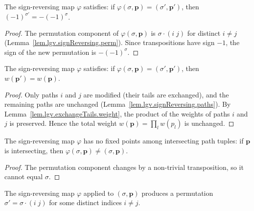 \begin{lemma}
\label{lem.lgv.signReversing.sign}
\leanhelper
\leanok
The sign-reversing map $\varphi$ satisfies: if
$\varphi(\sigma,\mathbf{p}) = (\sigma', \mathbf{p}')$, then
$(-1)^{\sigma'} = -(-1)^{\sigma}$.
\end{lemma}

\begin{proof}
\leanok
The permutation component of $\varphi(\sigma, \mathbf{p})$ is
$\sigma \cdot (i\; j)$ for distinct $i \ne j$
(Lemma~\ref{lem.lgv.signReversing.perm}).  Since transpositions
have sign $-1$, the sign of the new permutation is $-(-1)^\sigma$.
\end{proof}

\begin{lemma}
\label{lem.lgv.signReversing.weight}
\leanhelper
\leanok
The sign-reversing map $\varphi$ satisfies: if
$\varphi(\sigma, \mathbf{p}) = (\sigma', \mathbf{p}')$, then
$w(\mathbf{p}') = w(\mathbf{p})$.
\end{lemma}

\begin{proof}
\leanok
Only paths $i$ and $j$ are modified (their tails are exchanged), and
the remaining paths are unchanged
(Lemma~\ref{lem.lgv.signReversing.paths}).  By
Lemma~\ref{lem.lgv.exchangeTails.weight}, the product of the weights of
paths $i$ and $j$ is preserved.  Hence the total weight
$w(\mathbf{p}) = \prod_l w(p_l)$ is unchanged.
\end{proof}

\begin{lemma}
\label{lem.lgv.signReversing.noFixedPoints}
\leanhelper
\leanok
The sign-reversing map $\varphi$ has no fixed points among
intersecting path tuples: if $\mathbf{p}$ is intersecting, then
$\varphi(\sigma, \mathbf{p}) \ne (\sigma, \mathbf{p})$.
\end{lemma}

\begin{proof}
\leanok
The permutation component changes by a non-trivial transposition, so it
cannot equal $\sigma$.
\end{proof}

\begin{lemma}
\label{lem.lgv.signReversing.perm}
\leanhelper
\leanok
The sign-reversing map $\varphi$ applied to $(\sigma, \mathbf{p})$
produces a permutation $\sigma' = \sigma \cdot (i\; j)$ for some
distinct indices $i \ne j$.
\end{lemma}

